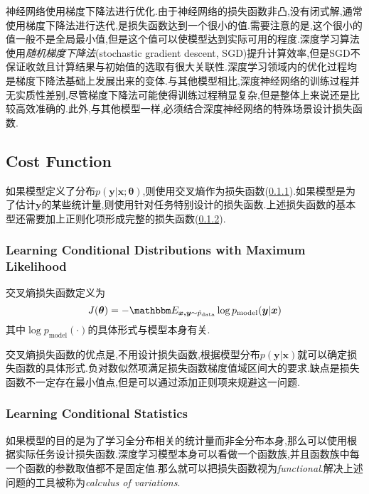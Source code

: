 神经网络使用梯度下降法进行优化.由于神经网络的损失函数非凸,没有闭式解,通常使用梯度下降法进行迭代,是损失函数达到一个很小的值.需要注意的是,这个很小的值一般不是全局最小值,但是这个值可以使模型达到实际可用的程度.深度学习算法使用\textit{随机梯度下降法}(stochastic gradient descent, SGD)提升计算效率,但是SGD不保证收敛且计算结果与初始值的选取有很大关联性.深度学习领域内的优化过程均是梯度下降法基础上发展出来的变体.与其他模型相比,深度神经网络的训练过程并无实质性差别,尽管梯度下降法可能使得训练过程稍显复杂,但是整体上来说还是比较高效准确的.此外,与其他模型一样,必须结合深度神经网络的特殊场景设计损失函数.

\subsection{Cost Function}

如果模型定义了分布$p(\bm y|\bm x;{\bm\theta})$,则使用交叉熵作为损失函数(\ref{sec:cost_func_distribution}).如果模型是为了估计$\bm y$的某些统计量,则使用针对任务特别设计的损失函数.上述损失函数的基本型还需要加上正则化项形成完整的损失函数(\ref{sec:cost_func_statistics}).

\subsubsection{Learning Conditional Distributions with Maximum Likelihood}\label{sec:cost_func_distribution}

交叉熵损失函数定义为
\begin{equation}
J({\bm\theta})=-\mathbbm E_{\bm{x,y}\sim\hat p_{\text{data}}}\log p_{\text{model}}(\bm y|\bm x)
\end{equation}
其中$\log p_{\text{model}}(\cdot)$的具体形式与模型本身有关.

交叉熵损失函数的优点是,不用设计损失函数,根据模型分布$p(\bm y|\bm x)$就可以确定损失函数的具体形式.负对数似然项满足损失函数梯度值域区间大的要求.缺点是损失函数不一定存在最小值点,但是可以通过添加正则项来规避这一问题.

\subsubsection{Learning Conditional Statistics}\label{sec:cost_func_statistics}

如果模型的目的是为了学习全分布相关的统计量而非全分布本身,那么可以使用根据实际任务设计损失函数.深度学习模型本身可以看做一个函数族,并且函数族中每一个函数的参数取值都不是固定值.那么就可以把损失函数视为\textit{functional}.解决上述问题的工具被称为\textit{calculus of variations}.

